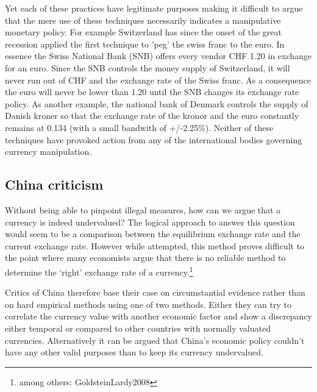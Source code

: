 \documentclass[11pt]{article}
\begin{document}
Yet each of these practices have legitimate purposes making it difficult 
to argue that the mere use of these techniques necessarily indicates a 
manipulative monetary policy. For example Switzerland has since the 
onset of the great recession applied the first technique to 'peg' the 
swiss franc to the euro. In essence the Swiss National Bank (SNB) offers 
every vendor CHF 1.20 in exchange for an euro. Since the SNB controls 
the money supply of Switzerland, it will never run out of CHF and the 
exchange rate of the Swiss franc. As a consequence the euro will never 
be lower than 1.20 until the SNB changes its exchange rate policy.  As 
another example, the national bank of Denmark controls the supply of 
Danish kroner so that the exchange rate of the kronor and the euro 
constantly remains at 0.134 (with a small bandwith of +/-2.25\%).  
Neither of these techniques have provoked action from any of the 
international bodies governing currency manipulation.



\subsection{China criticism}

Without being able to pinpoint illegal measures, how can we argue that a 
currency is indeed undervalued? The logical approach to answer this 
question would seem to be a comparison between the equilibrium exchange 
rate and the current exchange rate. However while attempted, this method 
proves difficult to the point where many economists argue that there is 
no reliable method to determine the `right' exchange rate of a 
currency.\footnote{among others: \cite{pp.  4}{GoldsteinLardy2008}}

Critics of China therefore base their case on circumstantial evidence 
rather than on hard empirical methods using one of two methods. Either 
they can try to correlate the currency value with another economic 
factor and show a discrepancy either temporal or compared to other 
countries with normally valuated currencies. Alternatively it can be 
argued that China's economic policy couldn't have any other valid 
purposes than to keep its currency undervalued.
\end{document}
